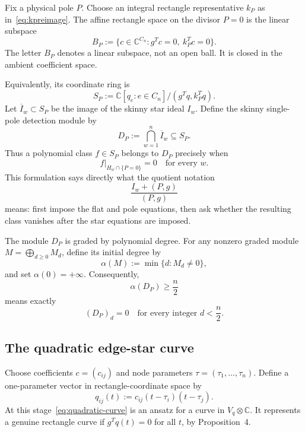 \documentclass[11pt]{article}
\theoremstyle{definition}
\newcommand{\C}{\mathbb C}
\newcommand{\initial}{\alpha}
\begin{document}
Fix a physical pole $P$.  Choose an integral rectangle representative $k_P$ as in~\eqref{eq:kpreimage}.  The affine rectangle space on the divisor $P=0$ is the linear subspace
\begin{equation}
B_P
:=
\bigl\{c\in\C^{C_n}:g^Tc=0,\ k_P^Tc=0\bigr\}.
\label{eq:BP}
\end{equation}
The letter $B_P$ denotes a linear subspace, not an open ball.  It is closed in the ambient coefficient space.

Equivalently, its coordinate ring is
\begin{equation}
S_P
:=
\C[q_e:e\in C_n]/(g^Tq,k_P^Tq).
\label{eq:SP}
\end{equation}
Let $\overline I_w\subset S_P$ be the image of the skinny star ideal $I_w$.  Define the skinny single-pole detection module by
\begin{equation}
D_P:=\bigcap_{w=1}^n\overline I_w\subseteq S_P.
\label{eq:DP}
\end{equation}
Thus a polynomial class $f\in S_P$ belongs to $D_P$ precisely when
\begin{equation}
f|_{H_w\cap\{P=0\}}=0
\quad\text{for every }w.
\label{eq:skinny-vanishing}
\end{equation}
This formulation says directly what the quotient notation
\[
\frac{I_w+(P,g)}{(P,g)}
\]
means: first impose the flat and pole equations, then ask whether the resulting class vanishes after the star equations are imposed.

The module $D_P$ is graded by polynomial degree.  For any nonzero graded module $M=\bigoplus_{d\ge0}M_d$, define its initial degree by
\begin{equation}
\initial(M):=\min\{d:M_d\neq0\},
\label{eq:alpha-def}
\end{equation}
and set $\initial(0)=+\infty$.  Consequently,
\[
\initial(D_P)\ge\frac n2
\]
means exactly
\[
(D_P)_d=0
\quad\text{for every integer }d<\frac n2.
\]

\subsection{The quadratic edge-star curve}

Choose coefficients $c=(c_{ij})$ and node parameters $\tau=(\tau_1,\ldots,\tau_n)$.  Define a one-parameter vector in rectangle-coordinate space by
\begin{equation}
q_{ij}(t):=c_{ij}(t-\tau_i)(t-\tau_j).
\label{eq:quadratic-curve}
\end{equation}
At this stage~\eqref{eq:quadratic-curve} is an ansatz for a curve in $V_q\otimes\C$.  It represents a genuine rectangle curve if $g^Tq(t)=0$ for all $t$, by Proposition~4.
\end{document}
